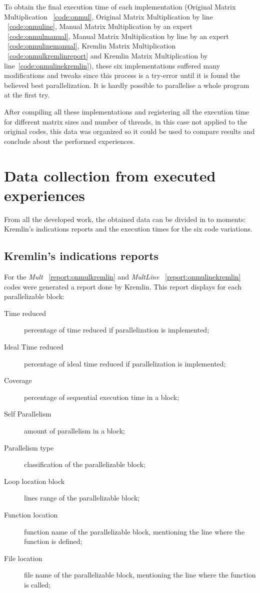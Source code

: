 To obtain the final execution time of each implementation (Original Matrix Multiplication ~\ref{code:onmul}, Original Matrix Multiplication by line ~\ref{code:onmuline}, Manual Matrix Multiplication by an expert ~\ref{code:onmulmanual}, Manual Matrix Multiplication by line by an expert ~\ref{code:onmulinemanual}, Kremlin Matrix Multiplication ~\ref{code:onmulkremlinreport} and Kremlin Matrix Multiplication by line~\ref{code:onmulinekremlin}), these six implementations suffered many modifications and tweaks since this process is a try-error until it is found the believed best parallelization. It is hardly possible to parallelise a whole program at the first try.

After compiling all these implementations and registering all the execution time for different matrix sizes and number of threads, in this case not applied to the original codes, this data was organized so it could be used to compare results and conclude about the performed experiences.

\section{Data collection from executed experiences}

From all the developed work, the obtained data can be divided in to moments: Kremlin's indications reports and the execution times for the six code variations.

\subsection{Kremlin's indications reports} 

For the \textit{Mult} ~\ref{report:onmulkremlin} and \textit{MultLine} ~\ref{report:onmulinekremlin} codes were generated a report done by Kremlin. This report displays for each parallelizable block:

\begin{description}
	\item[Time reduced] percentage of time reduced if parallelization is implemented;
	\item[Ideal Time reduced] percentage of  ideal time reduced if parallelization is implemented;
	\item[Coverage] percentage of sequential execution time in a block;
	\item[Self Parallelism] amount of parallelism in a block;
	\item[Parallelism type] classification of the parallelizable block;
	\item[Loop location block] lines range of the parallelizable block;
	\item[Function location] function name of the parallelizable block, mentioning the line where the function is defined;
	\item[File location] file name of the parallelizable block, mentioning the line where the function is called;
\end{description}

